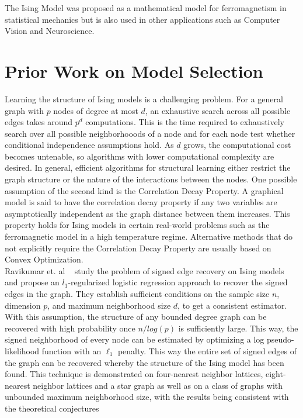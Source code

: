 \documentclass[11pt]{article}
\begin{document}
The Ising Model was proposed as a mathematical model for ferromagnetism in statistical mechanics but is also used in other applications such as Computer Vision and Neuroscience.

	

\section{Prior Work on Model Selection}

Learning the structure of Ising models is a challenging problem. 
For a general graph with $p$ nodes of degree at most $ d $, an exhaustive search across all possible edges takes around $ p^d $ computations. 
This is the time required to exhaustively search over all possible neighborhooods of a node and for each node test whether conditional independence assumptions hold. 
As $ d $ grows, the computational cost becomes untenable, so algorithms with lower computational complexity are desired.
In general, efficient algorithms for structural learning either restrict the graph structure or the nature of the interactions between the nodes. 
One possible assumption of the second kind is the Correlation Decay Property. 
A graphical model is said to have the correlation decay property if any two variables are asymptotically independent as the graph distance between them increases. 
This property holds for Ising models in certain real-world problems such as the ferromagnetic model in a high temperature regime. 
Alternative methods that do not explicitly require the Correlation Decay Property are usually based on Convex Optimization. \\

Ravikumar et. al ~\cite{ravikumar2010high} study the problem of signed edge recovery on Ising models and propose an $l_1$-regularized logistic regression approach to recover the signed edges in the graph.
They establish sufficient conditions on the sample size $n$, dimension $p$, and maximum neighborhood size $d$, to get a consistent estimator.
With this assumption, the structure of any bounded degree graph can be recovered with high probability once $n/log(p)$ is sufficiently large. 
This way, the signed neighborhood of every node can be estimated by optimizing a log pseudo-likelihood function with an $\ell_1$ penalty.
This way the entire set of signed edges of the graph can be recovered whereby the structure of the Ising model has been found.
This technique is demonstrated on four-nearest neighbor lattices, eight-nearest neighbor lattices and a star graph as well as on a class of graphs with unbounded maximum neighborhood size, with the results being consistent with the theoretical conjectures
\end{document}
